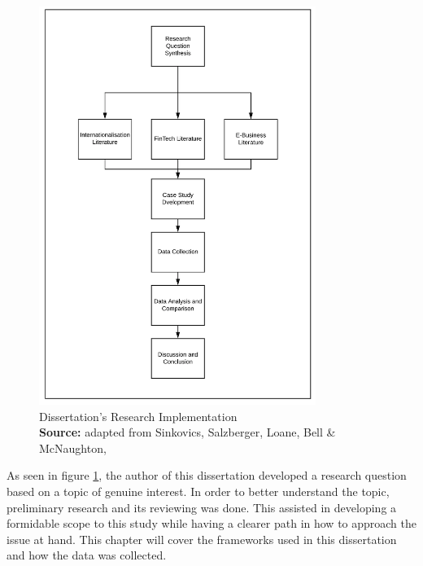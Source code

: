 \documentclass[11pt,a4paper]{article}
\newcommand*{\captionsource}[2]{%
  \caption[{#1}]{%
    #1%
    \\\hspace{\linewidth}%
    \textbf{Source:} #2%
  }%
}
\begin{document}
{{\begin{figure}[H]
	\centering
  \includegraphics[width=90mm]{figures/fig_research_plan}
  \vspace{5mm}
    \captionsetup{justification=centering,margin=2cm}
      \captionsource{Dissertation's Research Implementation}{adapted from Sinkovics, Salzberger, Loane, Bell \& McNaughton, \citeyear{sinkovicsEmployingInformationCommunication2006}}
	\label{fig:research_plan}
\end{figure}


As seen in figure \ref{fig:research_plan}, the author of this dissertation developed a research question based on a topic of genuine interest. In order to better understand the topic, preliminary research and its reviewing was done. This assisted in developing a formidable scope to this study while having a clearer path in how to approach the issue at hand. This chapter will cover the frameworks used in this dissertation and how the data was collected.


}}
\end{document}
